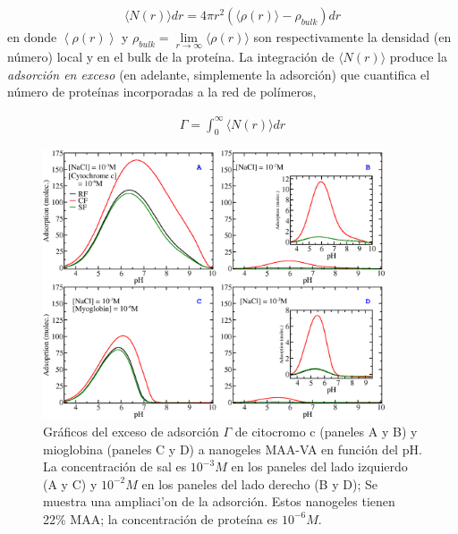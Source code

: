 \begin{align}
     \langle N(r)\rangle dr = 4\pi r^2 \left(\langle\rho(r)\rangle - \rho_{bulk}\right) dr
\end{align}
%
en donde $\left<\rho(r)\right>$ y $\rho_{bulk}=\lim\limits_{r\to \infty } \langle\rho(r)\rangle$ son respectivamente la densidad (en n\'umero) local y en el bulk de la prote\'ina.
La integraci\'on de $\langle N(r)\rangle$ produce la \emph{adsorci\'on en exceso} (en adelante, simplemente la adsorci\'on) que cuantifica el n\'umero de prote\'inas incorporadas a la red de pol\'imeros,


%
\begin{align}
    \Gamma =  \int_0^\infty{  \langle N(r)\rangle dr}
\end{align}
%



\begin{figure}[!htb]
\includegraphics[width=0.9\textwidth]{Figures/graphs-gel2/abcd.png}
\caption{Gr\'aficos del exceso de adsorci\'on $\Gamma$ de citocromo c (paneles A y B) y mioglobina (paneles C y D) a nanogeles MAA-VA en funci\'on del pH.
	La concentraci\'on de sal es $10^{-3}M$ en los paneles del lado izquierdo (A y C) y $10^{-2}M$ en los paneles del lado derecho
	(B y D); Se muestra una ampliaci'on de la adsorci\'on.
	Estos nanogeles tienen 22\% MAA; la concentraci\'on de prote\'ina es $10^{-6}M$.}
\label{fig:adsorption-vs-pH-cyto-myo}
\end{figure}



